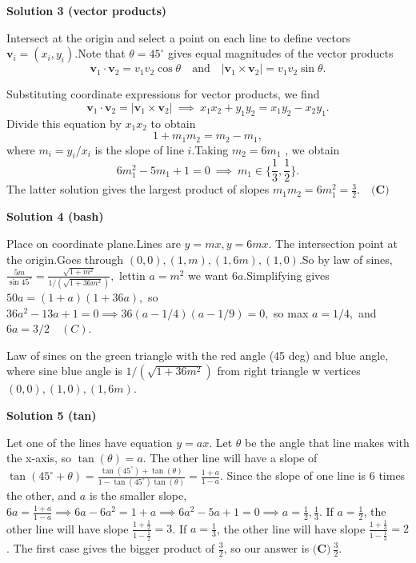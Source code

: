 \begin{enumerate}
\textbf{Solution 3 (vector products)}

Intersect at the origin and select a point on each line to define vectors $\mathbf{v}_{i}=(x_{i},y_{i})$.Note that $\theta=45^{\circ}$ gives equal magnitudes of the vector products
 \[\mathbf{v}_1\cdot\mathbf{v}_2 = v_{1}v_{2}\cos\theta \quad\mathrm{and}\quad |\mathbf{v}_1\times\mathbf{v}_2| = v_{1}v_{2}\sin\theta .\]

 Substituting coordinate expressions for vector products, we find
 \[\mathbf{v}_1\cdot\mathbf{v}_2 = |\mathbf{v}_1\times\mathbf{v}_2| \ \implies\ x_{1}x_{2}+y_{1}y_{2} = x_{1}y_{2}-x_{2}y_{1} .\]Divide this equation by $x_{1}x_{2}$ to obtain
 \[1+m_{1}m_{2} = m_{2}-m_{1} ,\]where $m_{i}=y_{i}/x_{i}$ is the slope of line $i$.Taking $m_{2}=6m_{1}$ , we obtain
 \[6m_{1}^{2}-5m_{1}+1 = 0 \ \implies\ m_{1} \in \{\frac{1}{3},\frac{1}{2}\} .\]The latter solution gives the largest product of slopes $m_{1}m_{2} = 6m_{1}^2 = \frac{3}{2} . \quad \boxed{\textbf{(C)}}$




\textbf{Solution 4 (bash)}

Place on coordinate plane.Lines are $y=mx, y=6mx.$ The intersection point at the origin.Goes through $(0,0),(1,m),(1,6m),(1,0).$So by law of sines, $\frac{5m}{\sin{45^{\circ}}} = \frac{\sqrt{1+m^2}}{1/(\sqrt{1+36m^2})},$ lettin $a=m^2$ we want $6a.$Simplifying gives $50a = (1+a)(1+36a),$ so $36a^2-13a+1=0 \implies 36(a-1/4)(a-1/9)=0,$ so max $a=1/4,$ and $6a=3/2 \quad \boxed{(C)}.$

 Law of sines on the green triangle with the red angle (45 deg) and blue angle, where sine blue angle is $1/(\sqrt{1+36m^2})$ from right triangle w vertices $(0,0),(1,0),(1,6m).$




\textbf{Solution 5 (tan)}

Let one of the lines have equation $y=ax$. Let $\theta$ be the angle that line makes with the x-axis, so $\tan(\theta)=a$. The other line will have a slope of $\tan(45^{\circ}+\theta)=\frac{\tan(45^{\circ})+\tan(\theta)}{1-\tan(45^{\circ})\tan(\theta)} = \frac{1+a}{1-a}$. Since the slope of one line is $6$ times the other, and $a$ is the smaller slope, $6a = \frac{1+a}{1-a} \implies 6a-6a^2=1+a \implies 6a^2-5a+1=0 \implies a=\frac{1}{2},\frac{1}{3}$. If $a = \frac{1}{2}$, the other line will have slope $\frac{1+\frac{1}{2}}{1-\frac{1}{2}} = 3$. If $a = \frac{1}{3}$, the other line will have slope $\frac{1+\frac{1}{3}}{1-\frac{1}{3}} = 2$. The first case gives the bigger product of $\frac{3}{2}$, so our answer is $\boxed{\textbf{(C)}\  \frac32}$.


\end{enumerate}
